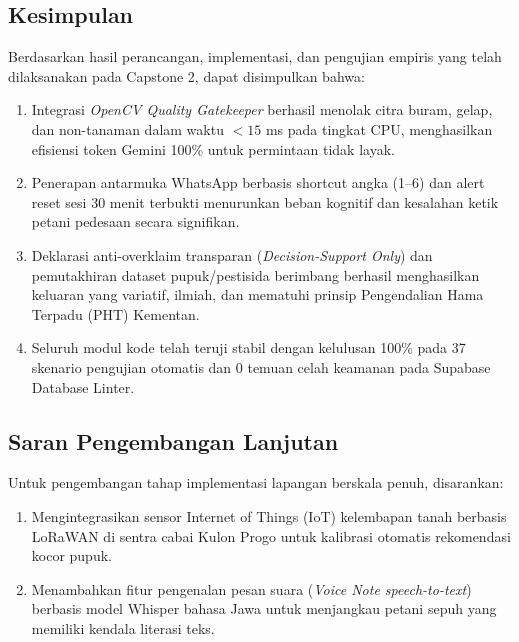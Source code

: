 \documentclass[11pt,a4paper]{article}
\begin{document}
\subsection{Kesimpulan}
Berdasarkan hasil perancangan, implementasi, dan pengujian empiris yang telah dilaksanakan pada Capstone 2, dapat disimpulkan bahwa:
\begin{enumerate}
    \item Integrasi \textit{OpenCV Quality Gatekeeper} berhasil menolak citra buram, gelap, dan non-tanaman dalam waktu $< 15$ ms pada tingkat CPU, menghasilkan efisiensi token Gemini 100\% untuk permintaan tidak layak.
    \item Penerapan antarmuka WhatsApp berbasis shortcut angka (1--6) dan alert reset sesi 30 menit terbukti menurunkan beban kognitif dan kesalahan ketik petani pedesaan secara signifikan.
    \item Deklarasi anti-overklaim transparan (\textit{Decision-Support Only}) dan pemutakhiran dataset pupuk/pestisida berimbang berhasil menghasilkan keluaran yang variatif, ilmiah, dan mematuhi prinsip Pengendalian Hama Terpadu (PHT) Kementan.
    \item Seluruh modul kode telah teruji stabil dengan kelulusan 100\% pada 37 skenario pengujian otomatis dan 0 temuan celah keamanan pada Supabase Database Linter.
\end{enumerate}

\subsection{Saran Pengembangan Lanjutan}
Untuk pengembangan tahap implementasi lapangan berskala penuh, disarankan:
\begin{enumerate}
    \item Mengintegrasikan sensor Internet of Things (IoT) kelembapan tanah berbasis LoRaWAN di sentra cabai Kulon Progo untuk kalibrasi otomatis rekomendasi kocor pupuk.
    \item Menambahkan fitur pengenalan pesan suara (\textit{Voice Note speech-to-text}) berbasis model Whisper bahasa Jawa untuk menjangkau petani sepuh yang memiliki kendala literasi teks.
\end{enumerate}
\end{document}
